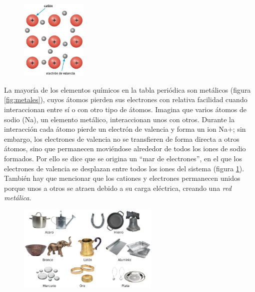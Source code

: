 \documentclass[11pt]{book}
\begin{document}
\begin{figure}
  \centering
  \includegraphics[width=0.28\textwidth]{electron_valencia.jpg}
  \label{fig:electron_valencia}
\end{figure}

La mayoría de los elementos químicos en la tabla periódica son metálicos
(figura \ref{fig:metales}), cuyos átomos pierden sus electrones con relativa facilidad cuando interaccionan
entre sí o con otro tipo de átomos. Imagina que varios átomos de sodio (Na), un elemento metálico, interaccionan
unos con otros. Durante la interacción cada átomo pierde un electrón de valencia y forma un ion Na+; sin embargo,
los electrones de valencia no se transfieren de forma directa a otros átomos, sino que permanecen moviéndose alrededor
de todos los iones de sodio formados. Por ello se dice que se origina un “mar de electrones”, en el
que los electrones de valencia se desplazan entre todos los iones del sistema (figura \ref{fig:electron_valencia}).
También hay que mencionar que los cationes y electrones permanecen unidos porque unos a otros se atraen debido a
su carga eléctrica, creando una \emph{red metálica}.


\begin{figure}[H]
  \centering
  \includegraphics[width=0.6\textwidth]{metalicas.jpg}
  \label{fig:metalicas}
\end{figure}
\end{document}
